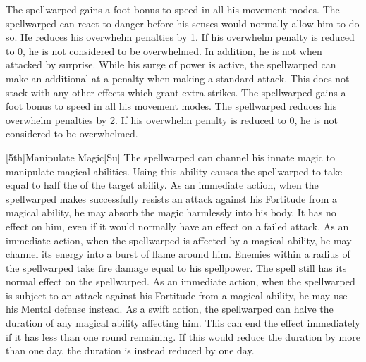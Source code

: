         The spellwarped gains a  foot bonus to speed in all his movement modes.
        The spellwarped can react to danger before his senses would normally allow him to do so.
        He reduces his overwhelm penalties by 1.
        If his overwhelm penalty is reduced to 0, he is not considered to be overwhelmed.
        In addition, he is not \unaware when attacked by surprise.
        While his surge of power is active, the spellwarped can make an additional  at a  penalty when making a standard attack.
        This does not stack with any other effects which grant extra strikes.
        The spellwarped gains a  foot bonus to speed in all his movement modes.
        The spellwarped reduces his overwhelm penalties by 2.
        If his overwhelm penalty is reduced to 0, he is not considered to be overwhelmed.

        [5th]{Manipulate Magic}[Su]
        The spellwarped can channel his innate magic to manipulate magical abilities.
        Using this ability causes the spellwarped to take  equal to half the  of the target ability.
        As an immediate action, when the spellwarped makes successfully resists an attack against his Fortitude from a magical ability, he may absorb the magic harmlessly into his body.
        It has no effect on him, even if it would normally have an effect on a failed attack.
        As an immediate action, when the spellwarped is affected by a magical ability, he may channel its energy into a burst of flame around him.
        Enemies within a \areamed radius of the spellwarped take fire damage equal to his spellpower.
        The spell still has its normal effect on the spellwarped.
        As an immediate action, when the spellwarped is subject to an attack against his Fortitude from a magical ability, he may use his Mental defense instead.
        As a swift action, the spellwarped can halve the duration of any magical ability affecting him.
        This can end the effect immediately if it has less than one round remaining.
        If this would reduce the duration by more than one day, the duration is instead reduced by one day.

